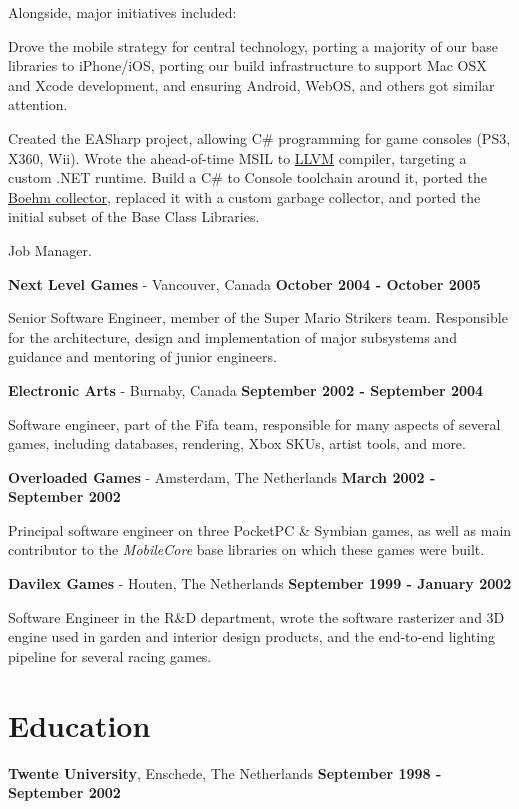 \documentclass[margin, line]{resume}
\begin{document}
\begin{resume}
Alongside, major initiatives included:
\\
\begin{list3}
\item{Drove the mobile strategy for central technology, porting a majority of our base libraries to iPhone/iOS, porting our build infrastructure to support Mac OSX and Xcode development, and ensuring Android, WebOS, and others got similar attention.}
\item{Created the EASharp project, allowing C\# programming for game consoles (PS3, X360, Wii). Wrote the ahead-of-time MSIL to \href{http://llvm.org/}{LLVM} compiler, targeting a custom .NET runtime. Build a C\# to Console toolchain around it, ported the \href{http://www.hpl.hp.com/personal/Hans_Boehm/gc/}{Boehm collector}, replaced it with a custom garbage collector, and ported the initial subset of the Base Class Libraries.}
\item{Job Manager.}
\end{list3}

{\bf Next Level Games} - Vancouver, Canada \hfill {\bf October 2004 - October 2005}

Senior Software Engineer, member of the Super Mario Strikers team.
Responsible for the architecture, design and implementation of major
subsystems and guidance and mentoring of junior engineers.

{\bf Electronic Arts} - Burnaby, Canada \hfill {\bf September 2002 - September 2004}

Software engineer, part of the Fifa team, responsible for many
aspects of several games, including databases, rendering, Xbox SKUs,
artist tools, and more.

{\bf Overloaded Games} - Amsterdam, The Netherlands \hfill {\bf March 2002 - September 2002}

Principal software engineer on three PocketPC \& Symbian games, as well as main contributor to the 
\emph{MobileCore} base libraries on which these games were built.

{\bf Davilex Games} - Houten, The Netherlands \hfill {\bf September 1999 - January 2002}

Software Engineer in the R\&D department, wrote the software rasterizer and 3D engine used in garden and interior design products, and the end-to-end lighting pipeline for several racing games.

\pagebreak

\section{\sc Education}
{\bf Twente University}, Enschede, The Netherlands \hfill {\bf September 1998 - September 2002}


\end{resume}
\end{document}
